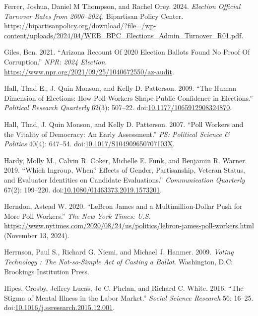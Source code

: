 \documentclass[
  12pt,
  letterpaper,
]{article}
\newlength{\cslhangindent}
\newenvironment{CSLReferences}[2] %
 {\begin{list}{}{%
  \setlength{\itemindent}{0pt}
  \setlength{\leftmargin}{0pt}
  \setlength{\parsep}{0pt}
  \ifodd #1
   \setlength{\leftmargin}{\cslhangindent}
   \setlength{\itemindent}{-1\cslhangindent}
  \fi
  \setlength{\itemsep}{#2\baselineskip}}}
 {\end{list}}
\begin{document}
\begin{CSLReferences}{1}{1}
Ferrer, Joshua, Daniel M Thompson, and Rachel Orey. 2024. \emph{Election
{Official Turnover Rates} from 2000--2024}. Bipartisan Policy Center.
\url{https://bipartisanpolicy.org/download/?file=/wp-content/uploads/2024/04/WEB_BPC_Elections_Admin_Turnover_R01.pdf}.

Giles, Ben. 2021. {``Arizona {Recount Of} 2020 {Election Ballots Found
No Proof Of Corruption}.''} \emph{NPR: 2024 Election}.
\url{https://www.npr.org/2021/09/25/1040672550/az-audit}.

Hall, Thad E., J. Quin Monson, and Kelly D. Patterson. 2009. {``The
{Human Dimension} of {Elections}: {How Poll Workers Shape Public
Confidence} in {Elections}.''} \emph{Political Research Quarterly}
62(3): 507--22.
doi:\href{https://doi.org/10.1177/1065912908324870}{10.1177/1065912908324870}.

Hall, Thad, J. Quin Monson, and Kelly D. Patterson. 2007. {``Poll
{Workers} and the {Vitality} of {Democracy}: {An Early Assessment}.''}
\emph{PS: Political Science \& Politics} 40(4): 647--54.
doi:\href{https://doi.org/10.1017/S104909650707103X}{10.1017/S104909650707103X}.

Hardy, Molly M., Calvin R. Coker, Michelle E. Funk, and Benjamin R.
Warner. 2019. {``Which Ingroup, When? {Effects} of Gender, Partisanship,
Veteran Status, and Evaluator Identities on Candidate Evaluations.''}
\emph{Communication Quarterly} 67(2): 199--220.
doi:\href{https://doi.org/10.1080/01463373.2019.1573201}{10.1080/01463373.2019.1573201}.

Herndon, Astead W. 2020. {``{LeBron James} and a {Multimillion-Dollar
Push} for {More Poll Workers}.''} \emph{The New York Times: U.S.}
\url{https://www.nytimes.com/2020/08/24/us/politics/lebron-james-poll-workers.html}
(November 13, 2024).

Herrnson, Paul S., Richard G. Niemi, and Michael J. Hanmer. 2009.
\emph{Voting Technology : The Not-so-Simple Act of Casting a Ballot}.
Washington, D.C: Brookings Institution Press.

Hipes, Crosby, Jeffrey Lucas, Jo C. Phelan, and Richard C. White. 2016.
{``The Stigma of Mental Illness in the Labor Market.''} \emph{Social
Science Research} 56: 16--25.
doi:\href{https://doi.org/10.1016/j.ssresearch.2015.12.001}{10.1016/j.ssresearch.2015.12.001}.


\end{CSLReferences}
\end{document}
